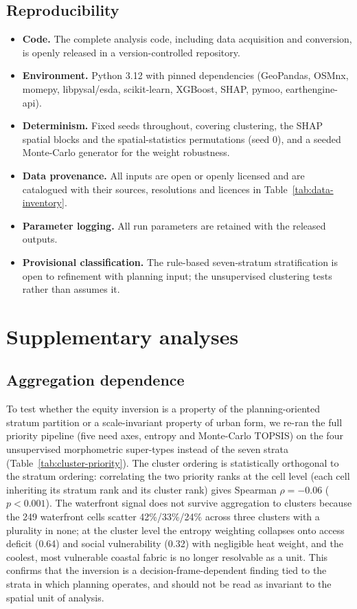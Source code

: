 \subsection{Reproducibility}
\label{app:repro}
\begin{itemize}
  \item \textbf{Code.} The complete analysis code, including data acquisition and
  conversion, is openly released in a version-controlled repository.
  \item \textbf{Environment.} Python 3.12 with pinned dependencies (GeoPandas, OSMnx,
  momepy, libpysal/esda, scikit-learn, XGBoost, SHAP, pymoo, earthengine-api).
  \item \textbf{Determinism.} Fixed seeds throughout, covering clustering, the SHAP
  spatial blocks and the spatial-statistics permutations (seed 0), and a seeded
  Monte-Carlo generator for the weight robustness.
  \item \textbf{Data provenance.} All inputs are open or openly licensed and are
  catalogued with their sources, resolutions and licences in
  Table~\ref{tab:data-inventory}.
  \item \textbf{Parameter logging.} All run parameters are retained with the released
  outputs.
  \item \textbf{Provisional classification.} The rule-based seven-stratum
  stratification is open to refinement with planning input; the unsupervised
  clustering tests rather than assumes it.
\end{itemize}

\section{Supplementary analyses}
\label{app:supp_analyses}

\subsection{Aggregation dependence}
\label{app:cluster-priority}
To test whether the equity inversion is a property of the planning-oriented stratum partition or a
scale-invariant property of urban form, we re-ran the full priority pipeline (five need axes, entropy and
Monte-Carlo TOPSIS) on the four unsupervised morphometric super-types instead of the seven strata
(Table~\ref{tab:cluster-priority}). The cluster ordering is statistically orthogonal to the stratum ordering:
correlating the two priority ranks at the cell level (each cell inheriting its stratum rank and its cluster rank)
gives Spearman $\rho = -0.06$ ($p < 0.001$). The waterfront signal does not survive aggregation to clusters
because the 249 waterfront cells scatter 42\%/33\%/24\% across three clusters with a plurality in none; at the
cluster level the entropy weighting collapses onto access deficit (0.64) and social vulnerability (0.32) with
negligible heat weight, and the coolest, most vulnerable coastal fabric is no longer resolvable as a unit. This
confirms that the inversion is a decision-frame-dependent finding tied to the strata in which planning operates,
and should not be read as invariant to the spatial unit of analysis.

